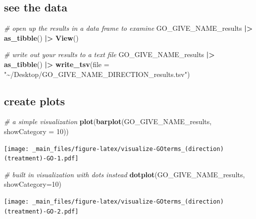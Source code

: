 \documentclass[
]{book}
\newenvironment{Shaded}{\begin{snugshade}}{\end{snugshade}}
\newcommand{\AttributeTok}[1]{\textcolor[rgb]{0.13,0.29,0.53}{#1}}
\newcommand{\CommentTok}[1]{\textcolor[rgb]{0.56,0.35,0.01}{\textit{#1}}}
\newcommand{\DecValTok}[1]{\textcolor[rgb]{0.00,0.00,0.81}{#1}}
\newcommand{\FunctionTok}[1]{\textcolor[rgb]{0.13,0.29,0.53}{\textbf{#1}}}
\newcommand{\NormalTok}[1]{#1}
\newcommand{\SpecialCharTok}[1]{\textcolor[rgb]{0.81,0.36,0.00}{\textbf{#1}}}
\newcommand{\StringTok}[1]{\textcolor[rgb]{0.31,0.60,0.02}{#1}}
\begin{document}
\hypertarget{see-the-data}{%
\subsection{see the data}\label{see-the-data}}

\begin{Shaded}
\begin{Highlighting}[]
\CommentTok{\# open up the results in a data frame to examine}
\NormalTok{GO\_GIVE\_NAME\_results }\SpecialCharTok{|\textgreater{}}
  \FunctionTok{as\_tibble}\NormalTok{() }\SpecialCharTok{|\textgreater{}}
  \FunctionTok{View}\NormalTok{()}

\CommentTok{\# write out your results to a text file}
\NormalTok{GO\_GIVE\_NAME\_results }\SpecialCharTok{|\textgreater{}}
  \FunctionTok{as\_tibble}\NormalTok{() }\SpecialCharTok{|\textgreater{}}
  \FunctionTok{write\_tsv}\NormalTok{(}\AttributeTok{file =} \StringTok{"\textasciitilde{}/Desktop/GO\_GIVE\_NAME\_DIRECTION\_results.tsv"}\NormalTok{)}
\end{Highlighting}
\end{Shaded}

\hypertarget{create-plots}{%
\subsection{create plots}\label{create-plots}}

\begin{Shaded}
\begin{Highlighting}[]
\CommentTok{\# a simple visualization}
\FunctionTok{plot}\NormalTok{(}\FunctionTok{barplot}\NormalTok{(GO\_GIVE\_NAME\_results, }\AttributeTok{showCategory =} \DecValTok{10}\NormalTok{))}
\end{Highlighting}
\end{Shaded}

\texttt{[image: \_main\_files/figure-latex/visualize-GOterms\_(direction)(treatment)-GO-1.pdf]}

\begin{Shaded}
\begin{Highlighting}[]
\CommentTok{\# built in visualization with dots instead}
\FunctionTok{dotplot}\NormalTok{(GO\_GIVE\_NAME\_results, }\AttributeTok{showCategory=}\DecValTok{10}\NormalTok{) }
\end{Highlighting}
\end{Shaded}

\texttt{[image: \_main\_files/figure-latex/visualize-GOterms\_(direction)(treatment)-GO-2.pdf]}
\end{document}

